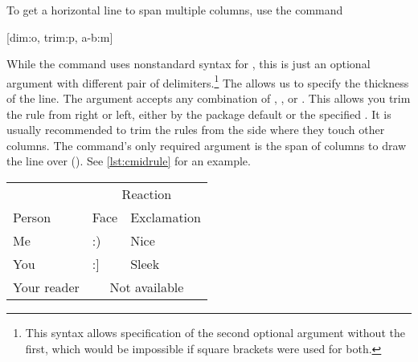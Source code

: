 To get a horizontal line to span multiple columns, use the command
\begin{lscommand}
  [dim:o, trim:p, a-b:m]
\end{lscommand}
While the command uses nonstandard syntax for , this is just an
optional argument with different pair of delimiters.\footnote{This syntax
  allows specification of the second optional argument without the first,
  which would be impossible if square brackets were used for both.} The
 allows us to specify the thickness of the line. The 
argument accepts any combination of , ,
 or . This allows you trim the rule from right
or left, either by the package default or the specified . It is
usually recommended to trim the rules from the side where they touch other
columns. The command's only required argument is the span of columns
to draw the line over (). See \autoref{lst:cmidrule} for an example.
\begin{listing}
  \begin{chktexignore}
  \begin{example}[examplewidth=0.85\linewidth, vertical_mode]
\begin{tabular}{@{}lll@{}}
  \toprule
              & \multicolumn{2}{c}{Reaction}      \\
  \cmidrule(l){2-3}
  Person      & Face & Exclamation                \\
  \midrule
  Me          & :)   & Nice                       \\
  You         & :]   & Sleek                      \\
  Your reader & \multicolumn{2}{c}{Not available} \\
  \bottomrule
\end{tabular}
\end{example}
\end{chktexignore}
  \caption{An example of using the  command inside a table.}\label{lst:cmidrule}
\end{listing}

